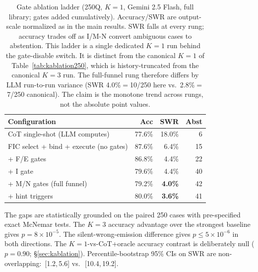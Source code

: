 \begin{table}[t]
\caption{Gate ablation ladder (250Q, $K{=}1$, Gemini 2.5 Flash, full library; gates added cumulatively).
Accuracy/SWR are output-scale normalized as in the main results.
SWR falls at every rung; accuracy trades off as I/M-N convert ambiguous cases to abstention.
This ladder is a single dedicated $K{=}1$ run behind the gate-disable switch.
It is distinct from the canonical $K{=}1$ of Table~\ref{tab:kablation250}, which is history-truncated from the canonical $K{=}3$ run.
The full-funnel rung therefore differs by LLM run-to-run variance (SWR 4.0\%${=}$10/250 here vs.\ 2.8\%${=}$7/250 canonical).
The claim is the monotone trend across rungs, not the absolute point values.}
\label{tab:gateladder}
\small
\begin{tabular}{@{}lrrr@{}}
\toprule
Configuration & Acc & SWR & Abst \\
\midrule
CoT single-shot (LLM computes) & 77.6\% & 18.0\% & 6 \\
FIC select + bind + execute (no gates) & 87.6\% & 6.4\% & 15 \\
\quad + F/E gates & 86.8\% & 4.4\% & 22 \\
\quad + I gate & 79.6\% & 4.4\% & 40 \\
\quad + M/N gates (full funnel) & 79.2\% & \textbf{4.0\%} & 42 \\
\quad + hint triggers & 80.0\% & \textbf{3.6\%} & 41 \\
\bottomrule
\end{tabular}
\end{table}
The gaps are statistically grounded on the paired 250 cases with pre-specified exact McNemar tests.
The $K{=}3$ accuracy advantage over the strongest baseline gives $p{=}8{\times}10^{-5}$.
The silent-wrong-emission difference gives $p{\leq}5{\times}10^{-6}$ in both directions.
The $K{=}1$-vs-CoT+oracle accuracy contrast is deliberately null ($p{=}0.90$; \S\ref{sec:kablation}).
Percentile-bootstrap 95\% CIs on SWR are non-overlapping: \vqSWRAll{}\,[1.2,\,5.6] vs.\ \cotoSWRAll{}\,[10.4,\,19.2].

